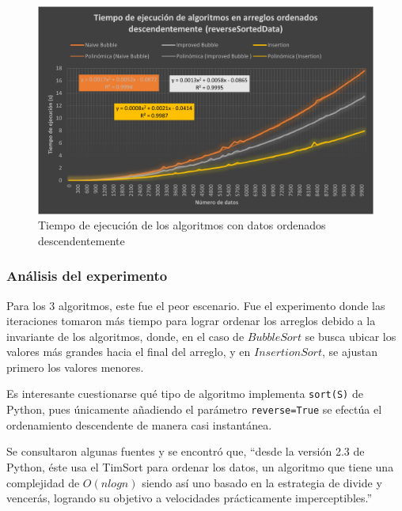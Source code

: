 \documentclass[letter]{article}
\begin{document}
\begin{figure}[h]
    \centering
    \includegraphics[scale=0.86]{reverseSortedDataGraphic.png}
    \caption{Tiempo de ejecución de los algoritmos con datos ordenados descendentemente}
   \label{experimentos:invertidas:grafica}
\end{figure}


\subsubsection{Análisis del experimento}
\label{experimentos:invertidas:analisis}
Para los 3 algoritmos, este fue el peor escenario. Fue el experimento donde las iteraciones tomaron más tiempo para lograr ordenar los arreglos debido a la invariante de los algoritmos, donde, en el caso de $Bubble Sort$ se busca ubicar los valores más grandes hacia el final del arreglo, y en $Insertion Sort$, se ajustan primero los  valores menores.

Es interesante cuestionarse qué tipo de algoritmo implementa \texttt{sort(S)} de Python, pues únicamente añadiendo el parámetro \texttt{reverse=True} se efectúa el ordenamiento descendente de manera casi instantánea.

Se consultaron algunas fuentes y se encontró que, ``desde la versión 2.3 de Python, éste usa el TimSort para ordenar los datos, un algoritmo que tiene una complejidad de $O(nlogn)$ siendo así uno basado en la estrategia de divide y vencerás, logrando su objetivo a velocidades prácticamente imperceptibles.'' \cite{Ed}
\end{document}
